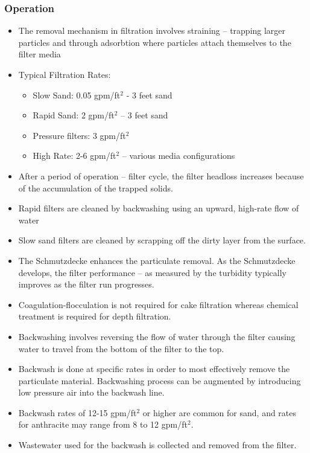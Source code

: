 \subsubsection{Operation}
\begin{itemize}
\item The removal mechanism in filtration involves straining – trapping larger particles and through adsorbtion where particles attach themselves to the filter media
\item Typical Filtration Rates:
\begin{itemize}
\item Slow Sand: 0.05 gpm/ft$^2$ - 3 feet sand
\item Rapid Sand: 2 gpm/ft$^2$ – 3 feet sand
\item Pressure filters: 3 gpm/ft$^2$
\item High Rate: 2-6 gpm/ft$^2$ – various media configurations
\end{itemize}

\item After a period of operation – filter cycle, the filter headloss increases because of the accumulation of the trapped solids.
\item Rapid filters are cleaned by backwashing using an upward, high-rate flow of water
\item Slow sand filters are cleaned by scrapping off the dirty layer from the surface.
\item The Schmutzdecke enhances the particulate removal.  As the Schmutzdecke develops, the filter performance – as measured by the turbidity typically improves as the filter run progresses.
\item Coagulation-flocculation is not required for cake filtration whereas chemical treatment is required for depth filtration.
\item Backwashing involves reversing the flow of water through the filter causing water to travel from the bottom of the filter to the top. 
\item Backwash is done at specific rates in order to most effectively remove the particulate material.  Backwashing process can be augmented by introducing low pressure air into the backwash line.
\item Backwash rates of 12-15 gpm/ft$^2$ or higher are common for sand, and rates for anthracite may range from 8 to 12 gpm/ft$^2$.
\item Wastewater used for the backwash is collected and removed from the filter. 







\end{itemize}
